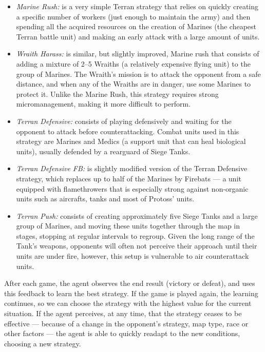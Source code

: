 \begin{itemize}
\item \textit{Marine Rush:} is a very simple Terran strategy that relies on quickly creating a specific number of workers (just enough to maintain the army) and then spending all the acquired resources on the creation of Marines (the cheapest Terran battle unit) and making an early attack with a large amount of units.

\item \textit{Wraith Harass:} is similar, but slightly improved, Marine rush that consists of adding 
a mixture of 2--5 Wraiths (a relatively expensive flying unit) to the group of Marines. The Wraith's mission is to attack the opponent from a safe distance, and when any of the Wraiths are in danger,  use some Marines to protect it.
Unlike the Marine Rush, this strategy requires strong micromanagement, making it more difficult to perform. 

\item \textit{Terran Defensive:} consists of playing defensively and waiting for the opponent to attack before counterattacking. 
Combat units used in this strategy are Marines and Medics (a support unit that can heal biological units),
usually defended by a rearguard of Siege Tanks.

\item \textit{Terran Defensive FB:} is slightly modified version of the Terran Defensive strategy, which replaces up to half of the Marines by Firebats --- a unit equipped with flamethrowers that is 
especially strong against non-organic units such as aircrafts, tanks and most of Protoss' units.

\item \textit{Terran Push:} consists of creating approximately five Siege Tanks and a large group of Marines, and moving these units together through the map in stages, stopping at regular intervals to regroup. 
Given the long range of the Tank's weapons, opponents will often not perceive their approach until their units are under fire, however, this setup is vulnerable to air counterattack units. 
\end{itemize}

After each game, the agent observes the end result (victory or defeat), and uses this feedback to learn the best strategy. 
If the game is played again, the learning continues, so we can choose the strategy with the highest value for the current situation. 
If the agent perceives, at any time, that the strategy ceases to be effective 
--- because of a change in the opponent's strategy, map type, race or other factors ---
the agent is able to quickly readapt to the new conditions, choosing a new strategy.



